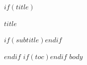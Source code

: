 \documentclass[11pt,a4paper,oneside]{book}
\begin{document}
$if(title)$
\frontmatter
\begin{titlepage}
\centering
{\sffamily\bfseries\Huge $title$\par}
$if(subtitle)$\vspace{1em}{\sffamily\Large $subtitle$\par}$endif$
\end{titlepage}
$endif$
$if(toc)$\tableofcontents\clearpage$endif$
\mainmatter
$body$
\end{document}
